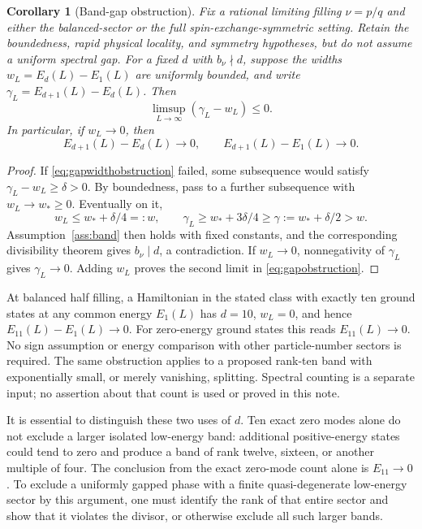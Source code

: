 \documentclass[11pt]{article}
\newtheorem{corollary}[theorem]{Corollary}
\theoremstyle{definition}
\theoremstyle{remark}
\begin{document}
\begin{corollary}[Band-gap obstruction]\label{cor:gapobstruction}
Fix a rational limiting filling \(\nu=p/q\) and either the
balanced-sector or the full spin-exchange-symmetric setting.
Retain the boundedness, rapid physical locality, and symmetry
hypotheses, but do not assume a uniform spectral gap.
For a fixed \(d\) with \(b_\nu\nmid d\), suppose the widths
\(w_L=E_d(L)-E_1(L)\) are uniformly bounded, and write
\(\gamma_L=E_{d+1}(L)-E_d(L)\).  Then
\begin{equation}\label{eq:gapwidthobstruction}
 \limsup_{L\to\infty}(\gamma_L-w_L)\le0.
\end{equation}
In particular, if \(w_L\to0\), then
\begin{equation}\label{eq:gapobstruction}
 E_{d+1}(L)-E_d(L)\longrightarrow0,
 \qquad E_{d+1}(L)-E_1(L)\longrightarrow0.
\end{equation}
\end{corollary}
\begin{proof}
If \eqref{eq:gapwidthobstruction} failed, some subsequence would
satisfy \(\gamma_L-w_L\ge\delta>0\).  By boundedness, pass to a
further subsequence with \(w_L\to w_*\ge0\).  Eventually on it,
\[
 w_L\le w_*+\delta/4=:w,\qquad
 \gamma_L\ge w_*+3\delta/4\ge\gamma:=w_*+\delta/2>w.
\]
Assumption~\ref{ass:band} then holds with fixed constants, and
the corresponding divisibility theorem gives \(b_\nu\mid d\),
a contradiction.  If \(w_L\to0\), nonnegativity of
\(\gamma_L\) gives \(\gamma_L\to0\).  Adding \(w_L\) proves
the second limit in \eqref{eq:gapobstruction}.
\end{proof}

At balanced half filling, a Hamiltonian in the stated class with
exactly ten ground states at any common energy \(E_1(L)\) has
\(d=10\), \(w_L=0\), and hence \(E_{11}(L)-E_1(L)\to0\).
For zero-energy ground states this reads \(E_{11}(L)\to0\).
No sign assumption or energy comparison with other particle-number
sectors is required.
The same obstruction applies to a proposed rank-ten band with
exponentially small, or merely vanishing, splitting.  Spectral
counting is a separate input; no assertion about that count is
used or proved in this note.

It is essential to distinguish these two uses of \(d\).
Ten exact zero modes alone do not exclude a larger isolated
low-energy band: additional positive-energy states could tend
to zero and produce a band of rank twelve, sixteen, or another
multiple of four.  The conclusion from the exact zero-mode
count alone is \(E_{11}\to0\).  To exclude a uniformly gapped
phase with a finite quasi-degenerate low-energy sector by this
argument, one must identify the rank of that entire sector and
show that it violates the divisor, or otherwise exclude all
such larger bands.
\end{document}
